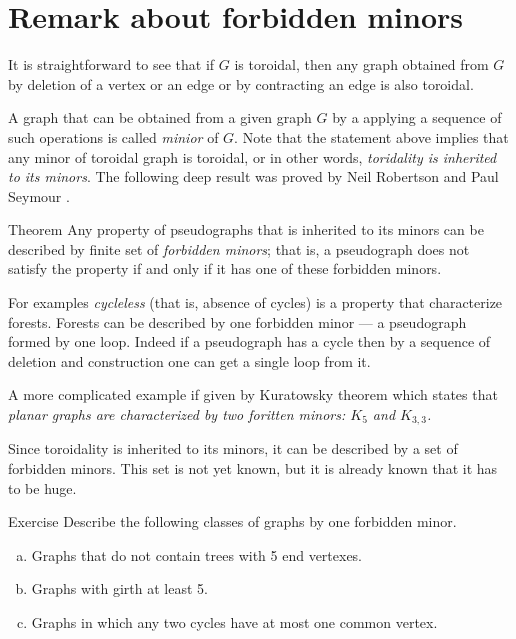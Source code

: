 \section*{Remark about forbidden minors}

It is straightforward to see that if $G$ is toroidal, then any graph obtained from $G$ by deletion of a vertex or an edge or by contracting an edge is also toroidal.

A graph that can be obtained from a given graph $G$ by a applying a sequence of such operations is called \emph{minior} of $G$.
Note that the statement above implies that any minor of toroidal graph is toroidal, or in other words, {}\emph{toridality is inherited to its minors}.
The following deep result was proved by Neil Robertson and Paul Seymour \cite{robertson-seymour}.

\begin{thm}{Theorem}
Any property of pseudographs that is inherited to its minors can be 
described by finite set of \emph{forbidden minors};
that is,  a pseudograph does not satisfy the property if and only if it has one of these forbidden minors.
\end{thm}

For examples {}\emph{cycleless} (that is, absence of cycles) is a property that characterize forests.
Forests can be described by one forbidden minor --- a pseudograph formed by one loop.
Indeed if a pseudograph has a cycle then by a sequence of deletion and construction one can get a single loop from it.

A more complicated example if given by Kuratowsky theorem which states that \emph{planar graphs are characterized by two foritten minors: $K_5$ and $K_{3,3}$.}

Since toroidality is inherited to its minors, it can be described by a set of forbidden minors.
This set is not yet known, but it is already known that it has to be huge.

\begin{thm}{Exercise}
Describe the following classes of graphs by one forbidden minor.
\begin{enumerate}[(a)]
 \item Graphs that do not contain trees with 5 end vertexes.
 \item Graphs with girth at least 5.
 \item Graphs in which any two cycles have at most one common vertex.
\end{enumerate}

\end{thm}

